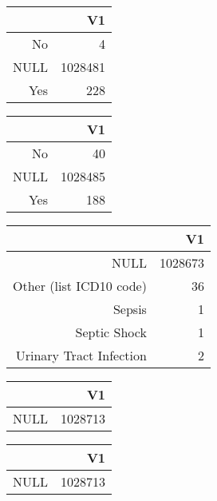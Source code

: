 \bigskip\bigskip
\centering
\begin{tabular}{rr}
  \hline
 & V1 \\ 
  \hline
No &   4 \\ 
  NULL & 1028481 \\ 
  Yes & 228 \\ 
   \hline
\end{tabular}

\bigskip\bigskip
\centering
\begin{tabular}{rr}
  \hline
 & V1 \\ 
  \hline
No &  40 \\ 
  NULL & 1028485 \\ 
  Yes & 188 \\ 
   \hline
\end{tabular}

\bigskip\bigskip
\centering
\begin{tabular}{rr}
  \hline
 & V1 \\ 
  \hline
NULL & 1028673 \\ 
  Other (list ICD10 code) &  36 \\ 
  Sepsis &   1 \\ 
  Septic Shock &   1 \\ 
  Urinary Tract Infection &   2 \\ 
   \hline
\end{tabular}

\bigskip\bigskip
\centering
\begin{tabular}{rr}
  \hline
 & V1 \\ 
  \hline
NULL & 1028713 \\ 
   \hline
\end{tabular}

\bigskip\bigskip
\centering
\begin{tabular}{rr}
  \hline
 & V1 \\ 
  \hline
NULL & 1028713 \\ 
   \hline
\end{tabular}

